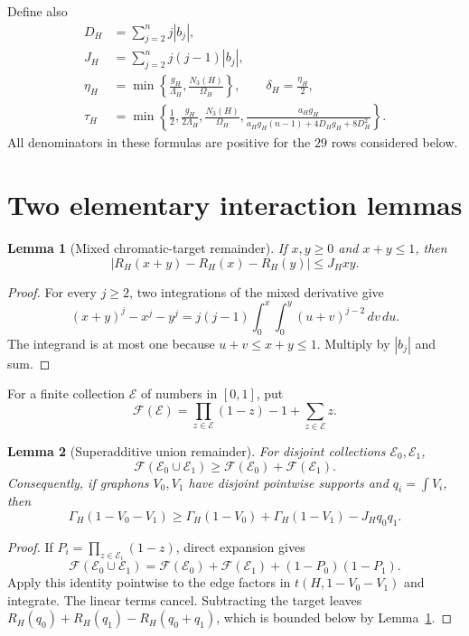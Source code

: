 \documentclass[11pt]{article}
\newtheorem{lemma}{Lemma}
\newcommand{\dd}{\,d}
\newcommand{\GammaH}{\Gamma_H}
\begin{document}
Define also
\begin{align}
 D_H&=\sum_{j=2}^{n}j|b_j|,\\
 J_H&=\sum_{j=2}^{n}j(j-1)|b_j|,\label{eq:J}\\
 \eta_H&=\min\left\{\frac{g_H}{\Lambda_H},
                       \frac{N_3(H)}{\Omega_H}\right\},
 \qquad
 \delta_H=\frac{\eta_H}{2},\label{eq:delta}\\
 \tau_H&=\min\left\{
 \frac12,
 \frac{g_H}{2\Lambda_H},
 \frac{N_3(H)}{\Omega_H},
 \frac{a_Hg_H}
 {a_Hg_H(n-1)+4D_Hg_H+8D_H^2}
 \right\}.\label{eq:tau}
\end{align}
All denominators in these formulas are positive for the $29$ rows considered
below.

\section{Two elementary interaction lemmas}

\begin{lemma}[Mixed chromatic-target remainder]
\label{lem:target}
If $x,y\geq0$ and $x+y\leq1$, then
\[
 |R_H(x+y)-R_H(x)-R_H(y)|\leq J_Hxy.
\]
\end{lemma}

\begin{proof}
For every $j\geq2$, two integrations of the mixed derivative give
\[
 (x+y)^j-x^j-y^j
 =j(j-1)\int_0^x\int_0^y(u+v)^{j-2}\dd v\dd u.
\]
The integrand is at most one because $u+v\leq x+y\leq1$.  Multiply by
$|b_j|$ and sum.
\end{proof}

For a finite collection $\mathcal E$ of numbers in $[0,1]$, put
\[
 \mathcal F(\mathcal E)=
 \prod_{z\in\mathcal E}(1-z)-1+\sum_{z\in\mathcal E}z.
\]

\begin{lemma}[Superadditive union remainder]
\label{lem:union}
For disjoint collections $\mathcal E_0,\mathcal E_1$,
\[
 \mathcal F(\mathcal E_0\cup\mathcal E_1)
 \geq\mathcal F(\mathcal E_0)+\mathcal F(\mathcal E_1).
\]
Consequently, if graphons $V_0,V_1$ have disjoint pointwise supports and
$q_i=\int V_i$, then
\begin{equation}
 \GammaH(1-V_0-V_1)
 \geq\GammaH(1-V_0)+\GammaH(1-V_1)
 -J_Hq_0q_1.
 \label{eq:split}
\end{equation}
\end{lemma}

\begin{proof}
If $P_i=\prod_{z\in\mathcal E_i}(1-z)$, direct expansion gives
\[
 \mathcal F(\mathcal E_0\cup\mathcal E_1)
 =\mathcal F(\mathcal E_0)+\mathcal F(\mathcal E_1)
 +(1-P_0)(1-P_1).
\]
Apply this identity pointwise to the edge factors in $t(H,1-V_0-V_1)$ and
integrate.  The linear terms cancel.  Subtracting the target leaves
$R_H(q_0)+R_H(q_1)-R_H(q_0+q_1)$, which is bounded below by
Lemma~\ref{lem:target}.
\end{proof}
\end{document}
